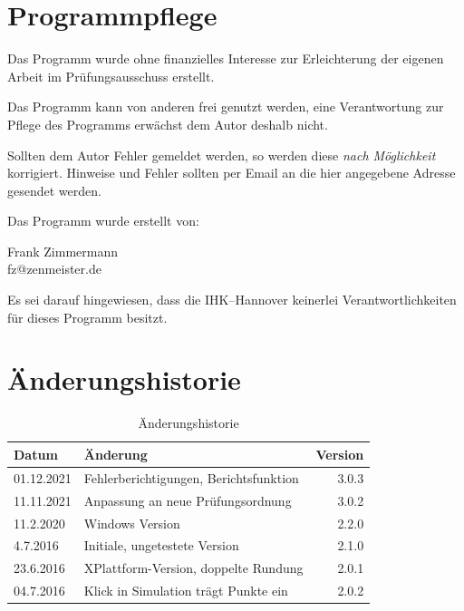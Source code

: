 \documentclass[a4paper,notitlepage,parskip=half]{scrartcl}
\begin{document}
\section{Programmpflege}
Das Programm wurde ohne finanzielles Interesse zur Erleichterung der eigenen Arbeit im Prüfungsausschuss erstellt.

Das Programm kann von anderen frei genutzt werden, eine Verantwortung zur Pflege des Programms erwächst dem Autor deshalb nicht.

Sollten dem Autor Fehler gemeldet werden, so werden diese \emph{nach Möglichkeit} korrigiert. Hinweise und Fehler sollten per Email an die hier angegebene Adresse gesendet werden.

Das Programm wurde erstellt von:

Frank Zimmermann\\
fz@zenmeister.de

Es sei darauf hingewiesen, dass die IHK--Hannover keinerlei Verantwortlichkeiten für dieses Programm besitzt.
\section{Änderungshistorie}
\begin{table}[H]\centering
\begin{tabular}{|l|l|r|}
\hline
Datum & Änderung &Version\\
\hline
01.12.2021&	Fehlerberichtigungen, Berichtsfunktion	&  3.0.3\\
11.11.2021& Anpassung an neue Prüfungsordnung &  3.0.2\\
11.2.2020&	Windows Version						&  2.2.0\\
4.7.2016&	Initiale, ungetestete Version		&  2.1.0\\
23.6.2016&	XPlattform-Version, doppelte Rundung&  2.0.1\\
04.7.2016&	Klick in Simulation trägt Punkte ein&  2.0.2\\
\hline
\end{tabular}
\caption{Änderungshistorie}
\end{table}
\end{document}
